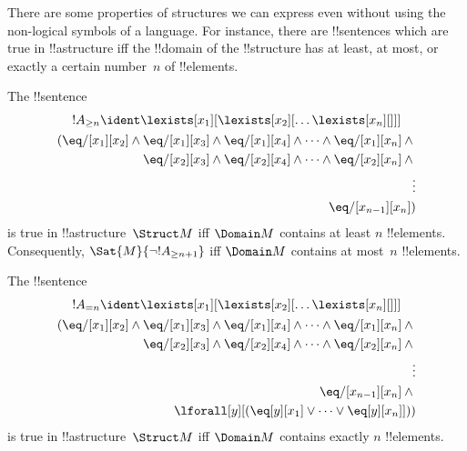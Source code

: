 \documentclass[../../../include/open-logic-section]{subfiles}
\begin{document}

\begin{explain}
There are some properties of structures we can express even without
using the non-logical symbols of a language.  For instance, there are
!!{sentence}s which are true in !!a{structure} iff the !!{domain} of
the !!{structure} has at least, at most, or exactly a certain
number~$n$ of !!{element}s.
\end{explain}

\begin{prop}
The !!{sentence}
\begin{multline*}
  !A_{\ge n} \ident \lexists[x_1][\lexists[x_2][\dots\lexists[x_n][{}]]]\\
  \begin{aligned}
  (\eq/[x_1][x_2] \land {}
  \eq/[x_1][x_3] \land \eq/[x_1][x_4] \land \dots \land \eq/[x_1][x_n] \land {}\\
\eq/[x_2][x_3] \land \eq/[x_2][x_4] \land \dots \land {} \eq/[x_2][x_n] \land {} \\
\vdots\\
\eq/[x_{n-1}][x_n])
\end{aligned}
\end{multline*}
is true in !!a{structure}~$\Struct M$ iff $\Domain M$ contains at
least $n$ !!{element}s. Consequently, $\Sat{M}{\lnot !A_{\ge n+1}}$ iff
$\Domain M$ contains at most~$n$ !!{element}s.

\end{prop}

\begin{prop}
The !!{sentence}
\begin{multline*}
!A_{= n} \ident \lexists[x_1][\lexists[x_2][\dots\lexists[x_n][{}]]] \\
\begin{aligned}
  (\eq/[x_1][x_2] \land {}
  \eq/[x_1][x_3] \land \eq/[x_1][x_4] \land \dots \land \eq/[x_1][x_n] \land {}\\
\eq/[x_2][x_3] \land \eq/[x_2][x_4] \land \dots \land {} \eq/[x_2][x_n] \land {} \\
\vdots\\
\eq/[x_{n-1}][x_n] \land {} \\
\lforall[y][(\eq[y][x_1] \lor \dots \lor \eq[y][x_n]]))
\end{aligned}
\end{multline*}
is true in !!a{structure}~$\Struct M$ iff $\Domain M$ contains
exactly $n$ !!{element}s.
\end{prop}
\end{document}

